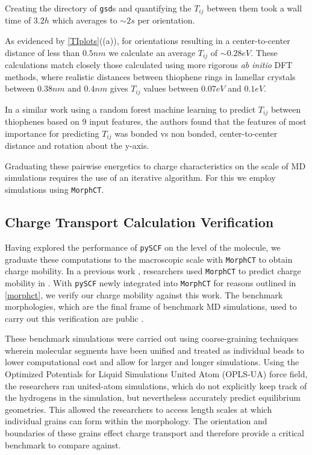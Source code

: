 Creating the directory of \texttt{gsd}s and quantifying the $T_{ij}$ between
them took a wall time of $3.2h$ which averages to ${\sim}2s$ per orientation. 

As evidenced by \autoref{TIplots}((a)), for orientations resulting in a center-to-center distance of less than
$0.5nm$ we calculate an average $T_{ij}$ of ${\sim} 0.28eV$.  
These calculations match closely those
calculated using more rigorous \textit{ab initio} DFT methods\cite{Lan2008},
where realistic distances between thiophene rings in lamellar  crystals 
between $0.38nm$ and $0.4 nm$ gives $T_{ij}$ values between $0.07eV$ and $0.1eV$. 

In a similar work using a random forest machine learning to predict $T_{ij}$
between thiophenes based on 9 input features, the authors found that the
features of most importance for predicting $T_{ij}$ was bonded vs non bonded,
center-to-center distance and rotation about the y-axis. \cite{Jankowski2019c}

Graduating these pairwise energetics to charge characteristics on the scale of MD simulations
requires the use of an iterative algorithm. For this we employ  simulations using \texttt{MorphCT}.

\subsection{Charge Transport Calculation Verification}

Having explored the performance of \texttt{pySCF} on the level of the molecule, we graduate these computations to the
macroscopic scale with \texttt{MorphCT} to obtain charge mobility.
In a previous work \cite{Miller2018}, researchers used \texttt{MorphCT} to predict charge mobility in . 
With \texttt{pySCF} newly integrated into \texttt{MorphCT} for reasons outlined in \autoref{morphct},
we verify our charge mobility against this work.
The benchmark morphologies, which are the final frame of benchmark MD simulations,
used to carry out this verification are public \cite{P3HTData}. 

These benchmark simulations were carried out using coarse-graining techniques
wherein molecular segments have been unified and treated as individual beads to lower
computational cost and allow for larger and longer simulations. 
Using the Optimized Potentials for Liquid Simulations United Atom (OPLS-UA) force field,
the researchers ran united-atom simulations, which do
not explicitly keep track of the hydrogens in the simulation, 
but nevertheless accurately predict equilibrium geometries. This allowed the researchers to access length scales
at which individual grains can form within the morphology. The orientation and boundaries of these grains effect
charge transport and therefore provide a critical benchmark to compare against. 

